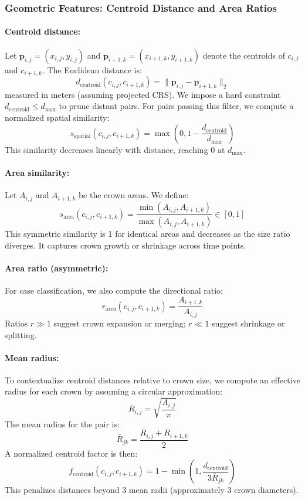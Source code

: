 \subsubsection{Geometric Features: Centroid Distance and Area Ratios}

\paragraph{Centroid distance:} Let $\mathbf{p}_{i,j} = (x_{i,j}, y_{i,j})$ and $\mathbf{p}_{i+1,k} = (x_{i+1,k}, y_{i+1,k})$ denote the centroids of $c_{i,j}$ and $c_{i+1,k}$. The Euclidean distance is:
\[
d_{\text{centroid}}(c_{i,j}, c_{i+1,k}) = \|\mathbf{p}_{i,j} - \mathbf{p}_{i+1,k}\|_2
\]
measured in meters (assuming projected CRS). We impose a hard constraint $d_{\text{centroid}} \leq d_{\max}$ to prune distant pairs. For pairs passing this filter, we compute a normalized spatial similarity:
\[
s_{\text{spatial}}(c_{i,j}, c_{i+1,k}) = \max\left(0, 1 - \frac{d_{\text{centroid}}}{d_{\max}}\right)
\]
This similarity decreases linearly with distance, reaching 0 at $d_{\max}$.

\paragraph{Area similarity:} Let $A_{i,j}$ and $A_{i+1,k}$ be the crown areas. We define:
\[
s_{\text{area}}(c_{i,j}, c_{i+1,k}) = \frac{\min(A_{i,j}, A_{i+1,k})}{\max(A_{i,j}, A_{i+1,k})} \in [0, 1]
\]
This symmetric similarity is 1 for identical areas and decreases as the size ratio diverges. It captures crown growth or shrinkage across time points.

\paragraph{Area ratio (asymmetric):} For case classification, we also compute the directional ratio:
\[
r_{\text{area}}(c_{i,j}, c_{i+1,k}) = \frac{A_{i+1,k}}{A_{i,j}}
\]
Ratios $r \gg 1$ suggest crown expansion or merging; $r \ll 1$ suggest shrinkage or splitting.

\paragraph{Mean radius:} To contextualize centroid distances relative to crown size, we compute an effective radius for each crown by assuming a circular approximation:
\[
R_{i,j} = \sqrt{\frac{A_{i,j}}{\pi}}
\]
The mean radius for the pair is:
\[
\bar{R}_{jk} = \frac{R_{i,j} + R_{i+1,k}}{2}
\]
A normalized centroid factor is then:
\[
f_{\text{centroid}}(c_{i,j}, c_{i+1,k}) = 1 - \min\left(1, \frac{d_{\text{centroid}}}{3\bar{R}_{jk}}\right)
\]
This penalizes distances beyond 3 mean radii (approximately 3 crown diameters).


